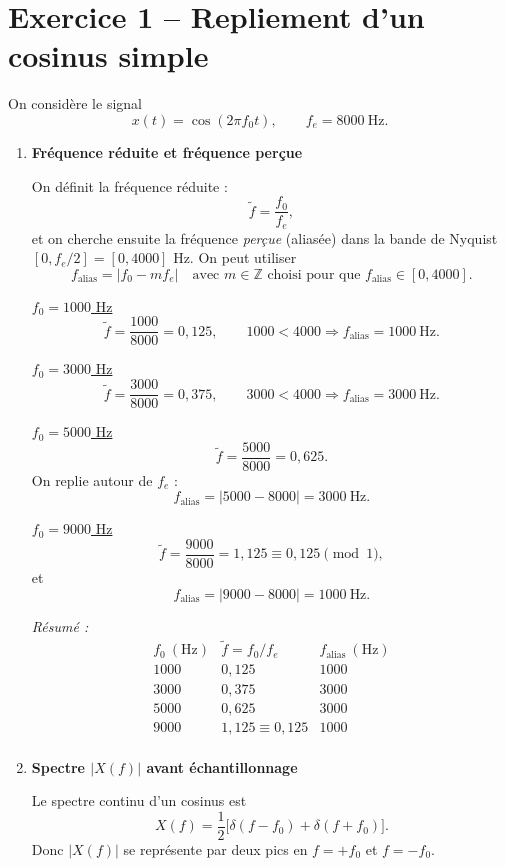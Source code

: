 
\section*{Exercice 1 – Repliement d’un cosinus simple}
On considère le signal
\[
x(t) = \cos(2\pi f_0 t), \qquad f_e = 8000~\text{Hz}.
\]

\begin{enumerate}[label=(\alph*)]

\item \textbf{Fréquence réduite et fréquence perçue}

On définit la fréquence réduite :
\[
\tilde f = \frac{f_0}{f_e},
\]
et on cherche ensuite la fréquence \emph{perçue} (aliasée) dans la bande de Nyquist
\([0, f_e/2] = [0, 4000]\) Hz. On peut utiliser
\[
f_{\text{alias}} = \big| f_0 - m f_e \big| \quad \text{avec } m\in\mathbb{Z}
\text{ choisi pour que } f_{\text{alias}} \in [0,4000].
\]

\medskip
\underline{$f_0 = 1000$ Hz}
\[
\tilde f = \frac{1000}{8000} = 0{,}125, \qquad 1000 < 4000
\Rightarrow f_{\text{alias}} = 1000~\text{Hz}.
\]

\underline{$f_0 = 3000$ Hz}
\[
\tilde f = \frac{3000}{8000} = 0{,}375, \qquad 3000 < 4000
\Rightarrow f_{\text{alias}} = 3000~\text{Hz}.
\]

\underline{$f_0 = 5000$ Hz}
\[
\tilde f = \frac{5000}{8000} = 0{,}625.
\]
On replie autour de $f_e$ :
\[
f_{\text{alias}} = |5000 - 8000| = 3000~\text{Hz}.
\]

\underline{$f_0 = 9000$ Hz}
\[
\tilde f = \frac{9000}{8000} = 1{,}125 \equiv 0{,}125 \pmod{1},
\]
et
\[
f_{\text{alias}} = |9000 - 8000| = 1000~\text{Hz}.
\]

\medskip
\noindent
\textit{Résumé :}
\[
\begin{array}{c|c|c}
f_0~(\text{Hz}) & \tilde f = f_0/f_e & f_{\text{alias}}~(\text{Hz}) \\
\hline
1000 & 0{,}125 & 1000 \\
3000 & 0{,}375 & 3000 \\
5000 & 0{,}625 & 3000 \\
9000 & 1{,}125 \equiv 0{,}125 & 1000 \\
\end{array}
\]

\item \textbf{Spectre $|X(f)|$ avant échantillonnage}

Le spectre continu d’un cosinus est
\[
X(f) = \frac{1}{2}\big[\delta(f-f_0) + \delta(f+f_0)\big].
\]
Donc $|X(f)|$ se représente par deux pics en $f = +f_0$ et $f = -f_0$. \\


\end{enumerate}
